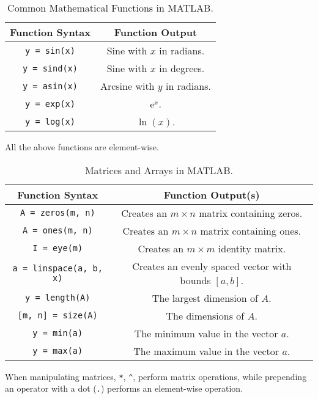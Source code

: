 \documentclass{article}
\begin{document}
\begin{table}[H]
    \centering
    \begin{tabular}{c | c}
        \toprule
        Function Syntax & Function Output \\
        \midrule
        \lstinline!y = sin(x)! & Sine with $x$ in radians. \\
        \lstinline!y = sind(x)! & Sine with $x$ in degrees. \\
        \lstinline!y = asin(x)! & Arcsine with $y$ in radians. \\
        \lstinline!y = exp(x)! & $\mathrm{e}^x$. \\
        \lstinline!y = log(x)! & $\ln{\left( x \right)}$. \\
        \bottomrule
    \end{tabular}
    \caption{Common Mathematical Functions in MATLAB.}
\end{table}
All the above functions are element-wise.
\begin{table}[H]
    \centering
    \begin{tabular}{c | c}
        \toprule
        Function Syntax & Function Output(s) \\
        \midrule
        \lstinline!A = zeros(m, n)! & Creates an $m \times n$ matrix containing zeros. \\
        \lstinline!A = ones(m, n)! & Creates an $m \times n$ matrix containing ones. \\
        \lstinline!I = eye(m)! & Creates an $m \times m$ identity matrix. \\
        \lstinline!a = linspace(a, b, x)! & Creates an evenly spaced vector with bounds $\left[a, b\right]$. \\
        \lstinline!y = length(A)! & The largest dimension of $A$. \\
        \lstinline![m, n] = size(A)! & The dimensions of $A$. \\
        \lstinline!y = min(a)! & The minimum value in the vector $a$. \\
        \lstinline!y = max(a)! & The maximum value in the vector $a$. \\
        \bottomrule
    \end{tabular}
    \caption{Matrices and Arrays in MATLAB.}
\end{table}
When manipulating matrices, \verb!*!, \verb!^!, perform matrix operations, while prepending an operator with a dot (\verb!.!) performs an element-wise operation.
\end{document}
